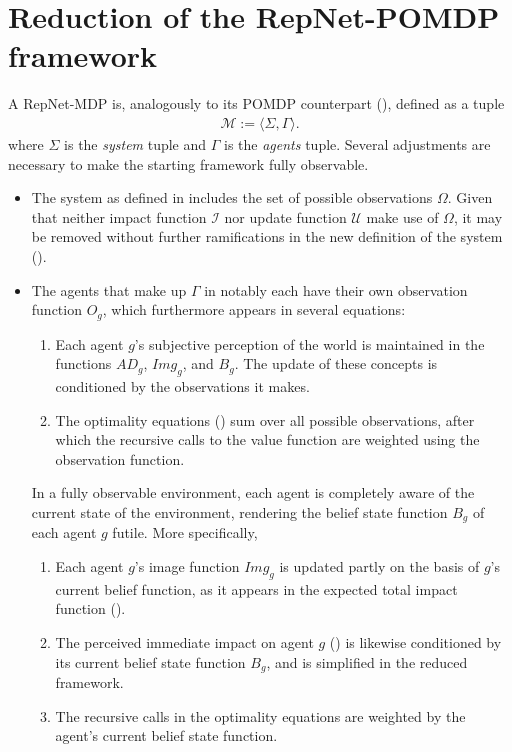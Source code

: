 \section{Reduction of the RepNet-POMDP framework}
\label{sec:reduct}
A RepNet-MDP is, analogously to its POMDP counterpart (), defined as a tuple
\begin{align*}
    \mathcal{M} := \big \langle \Sigma, \Gamma \big \rangle.
  \end{align*}
where $\Sigma$ is the \textit{system} tuple and $\Gamma$ is the \textit{agents} tuple. Several adjustments are necessary to make the starting framework fully observable. 
\begin{itemize}
    \item The system as defined in  includes the set of possible observations $\Omega$. Given that neither impact function $\mathcal{I}$ nor update function $\mathcal{U}$ make use of $\Omega$, it may be removed without further ramifications in the new definition of the system ().
    \item The agents that make up $\Gamma$ in  notably each have their own observation function $O_g$, which furthermore appears in several equations: 
    \begin{enumerate}
        \item Each agent $g$'s subjective perception of the world is maintained in the functions $AD_g$, $Img_g$, and $B_g$. The update of these concepts is conditioned by the observations it makes.
        \item The optimality equations () sum over all possible observations, after which the recursive calls to the value function are weighted using the observation function.
    \end{enumerate}
    In a fully observable environment, each agent is completely aware of the current state of the environment, rendering the belief state function $B_g$ of each agent $g$ futile. More specifically,
    \begin{enumerate}
        \item Each agent $g$'s image function $Img_g$ is updated partly on the basis of $g$'s current belief function, as it appears in the expected total impact function ().
        \item The perceived immediate impact on agent $g$ () is likewise conditioned by its current belief state function $B_g$, and is simplified in the reduced framework.
        \item The recursive calls in the optimality equations are weighted by the agent's current belief state function.
    \end{enumerate}
\end{itemize}

